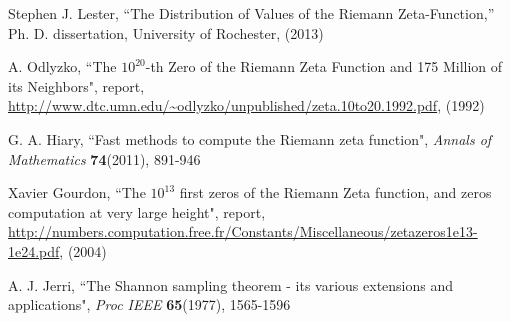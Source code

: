 \documentclass[twoside]{article}
\begin{document}
\begin{thebibliography}{10}
 Stephen J. Lester, ``The Distribution of Values of the
Riemann Zeta-Function,''
Ph. D. dissertation, University of Rochester,  (2013)

  A. Odlyzko,
``The $10^{20}$-th Zero of the Riemann Zeta
Function and 175 Million of its Neighbors", report,
\url{http://www.dtc.umn.edu/~odlyzko/unpublished/zeta.10to20.1992.pdf}, (1992)

 G. A. Hiary,
``Fast methods to compute the Riemann zeta function",
{\it Annals of Mathematics} {\bf74}(2011), 891-946

 Xavier Gourdon,
``The $10^{13}$ first zeros of the Riemann Zeta function,
and zeros computation at very large height", report,
\url{http://numbers.computation.free.fr/Constants/Miscellaneous/zetazeros1e13-1e24.pdf}, (2004)

 A. J. Jerri,
``The Shannon sampling theorem - its various extensions and applications",
{\it Proc IEEE} {\bf65}(1977), 1565-1596


\end{thebibliography} 
\end{document}
